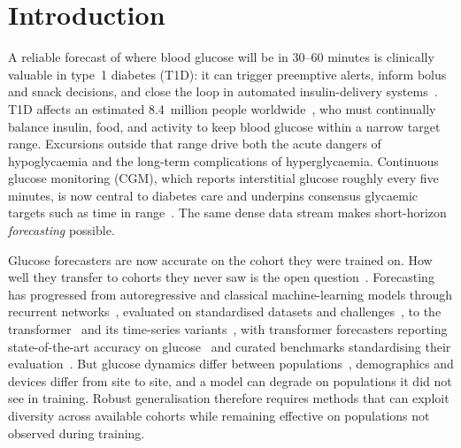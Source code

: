 \documentclass[10pt,letterpaper]{article}
\begin{document}
\clearpage
{}
\linenumbers

\section*{Introduction}

A reliable forecast of where blood glucose will be in 30--60 minutes is
clinically valuable in type~1 diabetes (T1D): it can trigger preemptive
alerts, inform bolus and snack decisions, and close the loop in automated
insulin-delivery systems~\cite{vettoretti2020advanced,bekiari2018ap}. T1D
affects an estimated 8.4~million people
worldwide~\cite{gregory2022t1dindex}, who must continually balance
insulin, food, and activity to keep blood glucose within a narrow target
range. Excursions outside that range drive both the acute dangers of
hypoglycaemia and the long-term complications of hyperglycaemia. Continuous
glucose monitoring (CGM), which reports interstitial glucose roughly every
five minutes, is now central to diabetes care and underpins consensus
glycaemic targets such as time in range~\cite{battelino2019tir}. The same
dense data stream makes short-horizon \emph{forecasting} possible.

Glucose forecasters are now accurate on the cohort they were trained on. How
well they transfer to cohorts they never saw is the open
question~\cite{ghimire2024generalize}. Forecasting has progressed from
autoregressive and classical machine-learning models through recurrent
networks~\cite{martinsson2020}, evaluated on standardised datasets and
challenges~\cite{marling2020ohio}, to the
transformer~\cite{vaswani2017attention} and its time-series
variants~\cite{zhou2021informer,wu2021autoformer}, with transformer
forecasters reporting state-of-the-art accuracy on
glucose~\cite{sergazinov2023gluformer} and curated benchmarks standardising
their evaluation~\cite{sergazinov2024glucobench}. But glucose dynamics differ
between populations~\cite{farahmand2025glumind}, demographics and devices
differ from site to site, and a model can degrade on populations it did not
see in training.
Robust generalisation therefore requires methods that can exploit diversity
across available cohorts while remaining effective on populations not
observed during training.
\end{document}
